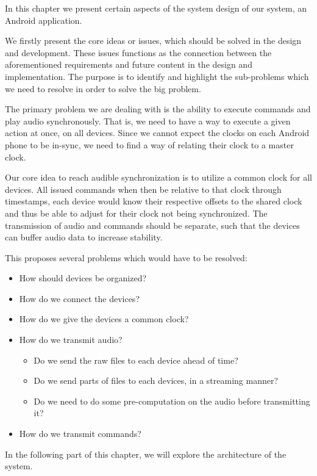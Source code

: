 In this chapter we present certain aspects of the system design of our system, an Android application.

We firstly present the core ideas or issues, which should be solved in the design and development.
These issues functions as the connection between the aforementioned requirements and future content in the design and implementation.
The purpose is to identify and highlight the sub-problems which we need to resolve in order to solve the big problem.

The primary problem we are dealing with is the ability to execute commands and play audio synchronously.
That is, we need to have a way to execute a given action at once, on all devices.
Since we cannot expect the clocks on each Android phone to be in-sync, we need to find a way of relating their clock to a master clock.

Our core idea to reach audible synchronization is to utilize a common clock for all devices.
All issued commands when then be relative to that clock through timestamps, each device would know their respective offsets to the shared clock and thus be able to adjust for their clock not being synchronized.
The transmission of audio and commands should be separate, such that the devices can buffer audio data to increase stability.

This proposes several problems which would have to be resolved:
\begin{itemize}
    \item How should devices be organized?
    \item How do we connect the devices?
    \item How do we give the devices a common clock?
    \item How do we transmit audio?
    \begin{itemize}
        \item Do we send the raw files to each device ahead of time?
        \item Do we send parts of files to each devices, in a streaming manner?
        \item Do we need to do some pre-computation on the audio before transmitting it?
    \end{itemize}
    \item How do we transmit commands?
\end{itemize}

\bigskip\noindent
In the following part of this chapter, we will explore the architecture of the system.

